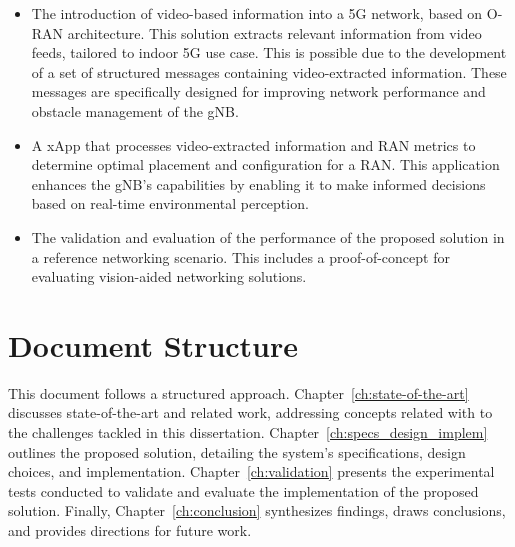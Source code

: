     \begin{itemize}
    
    \item The introduction of video-based information into a 5G network, based on O-RAN architecture.
    This solution extracts relevant information from video feeds, tailored to indoor 5G use case.
    This is possible due to the development of a set of structured messages containing video-extracted information.
    These messages are specifically designed for improving network performance and obstacle management of the gNB\@.
    
    \item A xApp that processes video-extracted information and RAN metrics to determine optimal placement and configuration for a RAN\@.
    This application enhances the gNB's capabilities by enabling it to make informed decisions based on real-time environmental perception.
    
    \item The validation and evaluation of the performance of the proposed solution in a reference networking scenario.
    This includes a proof-of-concept for evaluating vision-aided networking solutions.
    
    \end{itemize}


\section{Document Structure}\label{sec:document-structure}

This document follows a structured approach.
Chapter~\ref{ch:state-of-the-art} discusses state-of-the-art and related work, addressing concepts related with to the challenges tackled in this dissertation.
Chapter~\ref{ch:specs_design_implem} outlines the proposed solution, detailing the system's specifications, design choices, and implementation.
Chapter~\ref{ch:validation} presents the experimental tests conducted to validate and evaluate the implementation of the proposed solution.
Finally, Chapter~\ref{ch:conclusion} synthesizes findings, draws conclusions, and provides directions for future work.